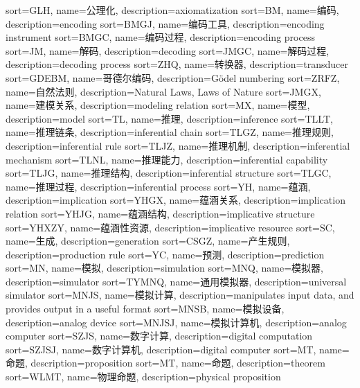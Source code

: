 {
  sort=GLH,
  name=公理化,
  description={axiomatization}
}
{
  sort=BM,
  name=编码,
  description={encoding}
}
{
  sort=BMGJ,
  name=编码工具,
  description={encoding instrument}
}
{
  sort=BMGC,
  name=编码过程,
  description={encoding process}
}
{
  sort=JM,
  name=解码,
  description={decoding}
}
{
  sort=JMGC,
  name=解码过程,
  description={decoding process}
}
{
  sort=ZHQ,
  name=转换器,
  description={transducer}
}
{
  sort=GDEBM,
  name=哥德尔编码,
  description={G{\"o}del numbering}
}
{
  sort=ZRFZ,
  name=自然法则,
  description={Natural Laws, Laws of Nature}
}
{
  sort=JMGX,
  name=建模关系,
  description={modeling relation}
}
{
  sort=MX,
  name=模型,
  description={model}
}
{
  sort=TL,
  name=推理,
  description={inference}
}
{
  sort=TLLT,
  name=推理链条,
  description={inferential chain}
}
{
  sort=TLGZ,
  name=推理规则,
  description={inferential rule}
}
{
  sort=TLJZ,
  name=推理机制,
  description={inferential mechanism}
}
{
  sort=TLNL,
  name=推理能力,
  description={inferential capability}
}
{
  sort=TLJG,
  name=推理结构,
  description={inferential structure}
}
{
  sort=TLGC,
  name=推理过程,
  description={inferential process}
}
{
  sort=YH,
  name=蕴涵,
  description={implication}
}
{
  sort=YHGX,
  name=蕴涵关系,
  description={implication relation}
}
{
  sort=YHJG,
  name=蕴涵结构,
  description={implicative structure}
}
{
  sort=YHXZY,
  name=蕴涵性资源,
  description={implicative resource}
}
{
  sort=SC,
  name=生成,
  description={generation}
}
{
  sort=CSGZ,
  name=产生规则,
  description={production rule}
}
{
  sort=YC,
  name=预测,
  description={prediction}
}
{
  sort=MN,
  name=模拟,
  description={simulation}
}
{
  sort=MNQ,
  name=模拟器,
  description={simulator}
}
{
  sort=TYMNQ,
  name=通用模拟器,
  description={universal simulator}
}
{
  sort=MNJS,
  name=模拟计算,
  description={manipulates input data, and provides output in a useful format}
}
{
  sort=MNSB,
  name=模拟设备,
  description={analog device}
}
{
  sort=MNJSJ,
  name=模拟计算机,
  description={analog computer}
}
{
  sort=SZJS,
  name=数字计算,
  description={digital computation}
}
{
  sort=SZJSJ,
  name=数字计算机,
  description={digital computer}
}
{
  sort=MT,
  name=命题,
  description={proposition}
}
{
  sort=MT,
  name=命题,
  description={theorem}
}
{
  sort=WLMT,
  name=物理命题,
  description={physical proposition}
}

